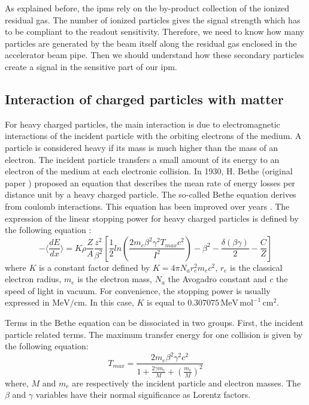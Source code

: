 \begin{refsection}
  As explained before, the \acrshort{ipm}s rely on the by-product collection of the ionized residual gas. The number of ionized particles gives the signal strength which has to be compliant to the readout sensitivity. Therefore, we need to know how many particles are generated by the beam itself along the residual gas enclosed in the accelerator beam pipe. Then we should understand how these secondary particles create a signal in the sensitive part of our \acrshort{ipm}.


  \subsection{Interaction of charged particles with matter}
  For heavy charged particles, the main interaction is due to electromagnetic interactions of the incident particle with the orbiting electrons of the medium. A particle is considered heavy if its mass is much higher than the mass of an electron. The incident particle transfers a small amount of its energy to an electron of the medium at each electronic collision. In 1930, H. Bethe (original paper \cite{Bethe1930}) proposed an equation that describes the mean rate of energy losses per distance unit by a heavy charged particle. The so-called Bethe equation derives from coulomb interactions. This equation has been improved over years \cite{Fermi1940,Fano1963}. The expression of the linear stopping power for heavy charged particles is defined by the following equation \cite[p. 446]{Tanabashi2018}:
  \begin{equation}
    - \bigg \langle \frac{dE}{dx} \bigg \rangle =K \rho \frac{Z}{A} \frac{z^{2}}{\beta^{2}} \left[\frac{1}{2} ln \left(\frac{2 m_{e} \beta^{2} \gamma^{2} T_{max}c^{2}}{I^{2}} \right) - \beta^{2} - \frac{\delta(\beta \gamma)}{2} - \frac{C}{Z} \right]
  \end{equation}
  \noindent where \(K\) is a constant factor defined by \(K=4 \pi N_{a} r_{e}^{2} m_{e} c^{2}\), \(r_{e}\) is the classical electron radius, \(m_{e}\) is the electron mass, \(N_{a}\) the Avogadro constant and $c$ the speed of light in vacuum. For convenience, the stopping power is usually expressed in \(\mathrm{MeV/cm}\). In this case, \(K\) is equal to \(0.307075\,\mathrm{MeV \, mol^{-1} \, cm^{2}}\).

  Terms in the Bethe equation can be dissociated in two groups. First, the incident particle related terms. The maximum transfer energy for one collision is given by the following equation:
  \begin{equation}
    T_{max} = \frac{2 m_{e} \beta^{2} \gamma^{2} c^{2}}{1 + \frac{2 \gamma m_{e} }{M} + \left( \frac{m_{e}}{M} \right)^{2}}
  \end{equation}
  \noindent where, \(M\) and \(m_{e}\) are respectively the incident particle and electron masses. The \(\beta\) and \(\gamma\) variables have their normal significance as Lorentz factors.


\end{refsection}

